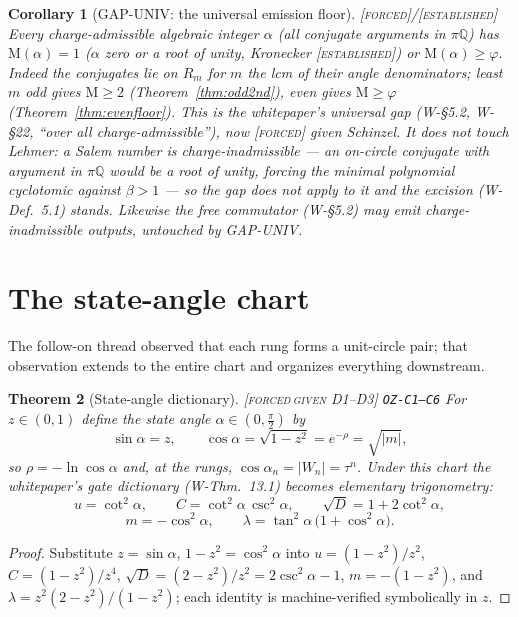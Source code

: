 \documentclass[11pt]{article}
\newcommand{\tagF}{\textcolor{cF}{\textsc{[forced]}}}
\newcommand{\tagFD}{\textcolor{cF}{\textsc{[forced}}\,\textcolor{cD}{\textsc{given D1--D3]}}}
\newcommand{\tagE}{\textcolor{cE}{\textsc{[established]}}}
\newcommand{\hx}[1]{\textcolor{cC}{\footnotesize\texttt{#1}}}
\newcommand{\Q}{\mathbb{Q}}
\newcommand{\gp}{\varphi}
\newcommand{\M}{\mathrm{M}}
\theoremstyle{plain}
\newtheorem{theorem}{Theorem}[section]
\newtheorem{corollary}[theorem]{Corollary}
\theoremstyle{definition}
\theoremstyle{remark}
\begin{document}
\begin{corollary}[GAP-UNIV: the universal emission floor]\label{cor:gapuniv}\tagF{}/\tagE{}
Every charge-admissible algebraic integer $\alpha$ (all conjugate arguments in
$\pi\Q$) has $\M(\alpha)=1$ ($\alpha$ zero or a root of unity, Kronecker \tagE{})
or $\M(\alpha)\ge\gp$. Indeed the conjugates lie on $R_m$ for $m$ the lcm of their
angle denominators; least $m$ odd gives $\M\ge2$ (Theorem~\ref{thm:odd2nd}), even
gives $\M\ge\gp$ (Theorem~\ref{thm:evenfloor}). This is the whitepaper's universal
gap (W-\S5.2, W-\S22, ``over all charge-admissible''), now \tagF{} given Schinzel.
\emph{It does not touch Lehmer:} a Salem number is charge-\emph{inadmissible} ---
an on-circle conjugate with argument in $\pi\Q$ would be a root of unity, forcing
the minimal polynomial cyclotomic against $\beta>1$ --- so the gap does not apply
to it and the excision (W-Def.\ 5.1) stands. Likewise the free commutator
(W-\S5.2) may emit charge-inadmissible outputs, untouched by GAP-UNIV.
\end{corollary}

\section{The state-angle chart}\label{sec:stateangle}

The follow-on thread observed that each rung forms a unit-circle pair; that
observation extends to the entire chart and organizes everything downstream.

\begin{theorem}[State-angle dictionary]\label{thm:stateangle}\tagFD{} \hx{OZ-C1--C6}
For $z\in(0,1)$ define the \emph{state angle} $\alpha\in(0,\tfrac\pi2)$ by
\[
\sin\alpha=z,\qquad \cos\alpha=\sqrt{1-z^2}=e^{-\rho}=\sqrt{|m|},
\]
so $\rho=-\ln\cos\alpha$ and, at the rungs, $\cos\alpha_n=|W_n|=\tau^n$.
Under this chart the whitepaper's gate dictionary (W-Thm.\ 13.1) becomes
elementary trigonometry:
\[
u=\cot^2\alpha,\qquad
C=\cot^2\alpha\,\csc^2\alpha,\qquad
\sqrt D=1+2\cot^2\alpha,
\]
\[
m=-\cos^2\alpha,\qquad
\lambda=\tan^2\alpha\,\bigl(1+\cos^2\alpha\bigr).
\]
\end{theorem}

\begin{proof}
Substitute $z=\sin\alpha$, $1-z^2=\cos^2\alpha$ into $u=(1-z^2)/z^2$,
$C=(1-z^2)/z^4$, $\sqrt D=(2-z^2)/z^2=2\csc^2\alpha-1$,
$m=-(1-z^2)$, and $\lambda=z^2(2-z^2)/(1-z^2)$; each identity is
machine-verified symbolically in $z$.
\end{proof}
\end{document}
